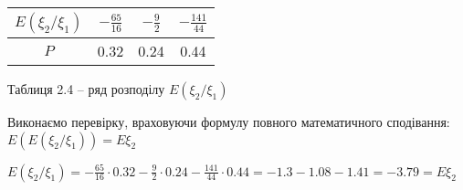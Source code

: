 \documentclass[a4paper, 20pt, titlepage]{article}
\begin{document}
\begin{spacing}{1.4}
\begin{enumerate}
\begin{center}
\begin{tabular}{|c|c|c|c|}
\hline
$E(\xi_2/\xi_1)$ & $-\frac{65}{16}$ & $ -\frac{9}{2}$ & $ - \frac{141}{44}$  \\ \hline
$P$ & 0.32 & 0.24 & 0.44\\ \hline
\end{tabular}

\vspace{1mm}
Таблиця 2.4 -- ряд розподілу $E(\xi_2/\xi_1)$
\end{center}

Виконаємо перевірку, враховуючи формулу повного математичного сподівання: $E(E(\xi_2/\xi_1)) = E \xi_2$

\vspace{1mm}
\begin{spacing}{2}
$E(\xi_2 / \xi_1) = \displaystyle{-\frac{65}{16} \cdot 0.32 - \frac{9}{2} \cdot 0.24  - \frac{141}{44} \cdot 0.44 = -1.3 - 1.08 - 1.41 = -3.79 = E \xi_2}$
\end{spacing}


\end{enumerate}
\end{spacing}

\newpage{}


	

\newcommand \INT[3]{ \frac{1}{5+2\pi}\int \limits_{#1}^{#2} \left( #3 \right)}
\end{document}
